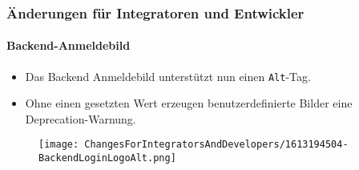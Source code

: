 %

\begin{frame}[fragile]
	\frametitle{Änderungen für Integratoren und Entwickler}
	\framesubtitle{Backend-Anmeldebild}


	\begin{itemize}
		\item Das Backend Anmeldebild unterstützt nun einen \texttt{Alt}-Tag.
		\item Ohne einen gesetzten Wert erzeugen benutzerdefinierte Bilder eine Deprecation-Warnung.
	\end{itemize}

	\begin{figure}
		\texttt{[image: ChangesForIntegratorsAndDevelopers/1613194504-BackendLoginLogoAlt.png]}
	\end{figure}

\end{frame}

